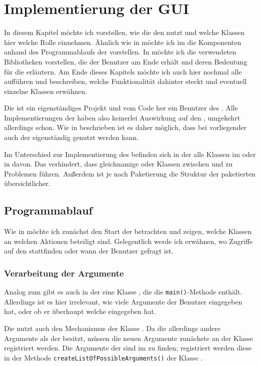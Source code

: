 \chapter{Implementierung der GUI}
In diesem Kapitel möchte ich vorstellen, wie die \mdg den \md nutzt und welche Klassen hier welche Rolle einnehmen. Ähnlich wie in  möchte ich im  die Komponenten anhand des Programmablaufs der \mdg vorstellen. In  möchte ich die verwendeten Bibliotheken vorstellen, die der Benutzer am Ende erhält und deren Bedeutung für die \mdg erläutern. Am Ende dieses Kapitels möchte ich auch hier nochmal alle \packages aufführen und beschreiben, welche Funktionalität dahinter steckt und eventuell einzelne Klassen erwähnen.

Die \mdg ist ein eigenständiges Projekt und vom Code her ein Benutzer des \md. Alle Implementierungen der \mdg haben also keinerlei Auswirkung auf den \md, umgekehrt allerdings schon. Wie in  beschrieben ist es daher möglich, dass bei vorliegender \mdg auch der \md eigenständig genutzt werden kann.

Im Unterschied zur Implementierung des \md befinden sich in der \mdg alle Klassen im \package {} oder in \subpackages davon. Das verhindert, dass gleichnamige \packages oder Klassen zwischen \md und \mdg zu Problemen führen. Außerdem ist je nach Paketierung die Struktur der paketierten \mdg übersichtlicher.

\section{Programmablauf}
Wie in  möchte ich zunächst den Start der \mdg betrachten und zeigen, welche Klassen an welchen Aktionen beteiligt sind. Gelegentlich werde ich erwähnen, wo Zugriffe auf den \md stattfinden oder wann der Benutzer gefragt ist.

\subsection{Verarbeitung der Argumente}
Analog zum \md gibt es auch in der \mdg eine Klasse , die die \texttt{main()}-Methode enthält. Allerdings ist es hier irrelevant, wie viele Argumente der Benutzer eingegeben hat, oder ob er überhaupt welche eingegeben hat.

Die \mdg nutzt auch den Mechanismus der Klasse . Da die \mdg allerdings andere Argumente als der \md besitzt, müssen die neuen Argumente zunächste an der Klasse  registriert werden. Die Argumente der \mdg sind im \package {} zu finden; registriert werden diese in der Methode \texttt{createListOfPossibleArguments()} der Klasse .

